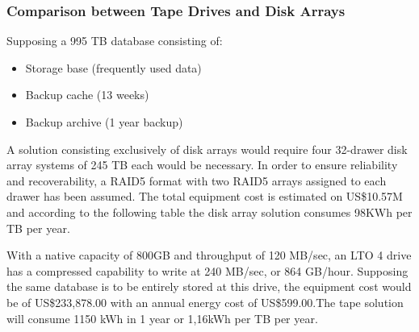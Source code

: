             \subsubsection*{Comparison between Tape Drives and Disk Arrays}
                Supposing a 995 TB database consisting of:
                \begin{itemize}
                	\item Storage base (frequently used data)
                	\item Backup cache (13 weeks)
                	\item Backup archive (1 year backup)
                \end{itemize}
                A solution consisting exclusively of disk arrays would require four 32-drawer disk array systems of 245 TB each would be necessary. In order to ensure reliability and recoverability, a RAID5 format with two RAID5 arrays assigned to each drawer has been assumed. The total equipment cost is estimated on US\$10.57M \cite{Reine08} and according to the following table the disk array solution consumes 98KWh per TB per year.
                \begin{table}[h!tb]
                \centering 
                \label{tab:tape_drive_power_costs} %
                \end{table}
                With a native capacity of 800GB and throughput of 120 MB/sec, an LTO 4 drive has a compressed capability to write at 240 MB/sec, or 864 GB/hour. Supposing the same database is to be entirely stored at this drive, the equipment cost would be of US\$233,878.00 with an annual energy cost of US\$599.00.The tape solution will consume 1150 kWh in 1 year or 1,16kWh per TB per year.
